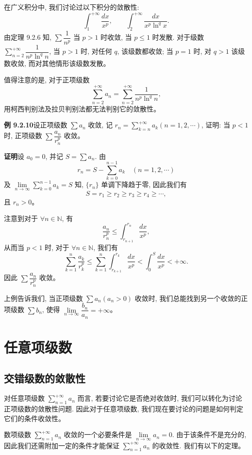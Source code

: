 \documentclass[UTF8, 12pt, fontset=fandol, oneside]{ctexart}
\begin{document}
在广义积分中, 我们讨论过以下积分的敛散性:
\[
  \int_1^{+\infty}\frac{dx}{x^p},\qquad
  \int_2^{+\infty}\frac{dx}{x^p\ln^q x}.
\]
由定理 9.2.6 知, $\sum\dfrac1{n^p}$ 当 $p>1$ 时收敛, 当 $p\leq1$ 时发散. 对于级数 $\sum\limits_{n=2}^{+\infty}\dfrac1{n^p\ln^q n}$, 当 $p>1$ 时, 对任何 $q$, 该级数都收敛; 当 $p=1$ 时, 对 $q>1$ 该级数收敛, 而对其他情形该级数发散。

值得注意的是, 对于正项级数
\[
  \sum_{n=2}^{+\infty}a_n=\sum_{n=2}^{+\infty}\frac1{n^p\ln^q n},
\]
用柯西判别法及拉贝判别法都无法判别它的敛散性。

\noindent\textbf{例 9.2.10}\quad 设正项级数 $\sum a_n$ 收敛, 记 $r_n=\sum\limits_{k=n}^{+\infty}a_k(n=1,2,\cdots)$, 证明: 当 $p<1$ 时, 正项级数 $\sum\dfrac{a_n}{r_n^p}$ 收敛。

\noindent\textbf{证明}\quad 设 $a_0=0$, 并记 $S=\sum a_n$. 由
\[
  r_n=S-\sum_{k=0}^{n-1}a_k\quad(n=1,2,\cdots)
\]
及 $\lim\limits_{n\to\infty}\sum\limits_{k=0}^{n-1}a_k=S$ 知, $\{r_n\}$ 单调下降趋于零, 因此我们有
\[
  S=r_1\geq r_2\geq r_3\geq r_4\geq\cdots,
\]
且 $r_n>0$。

注意到对于 $\forall n\in\mathbb{N}$, 有
\[
  \frac{a_n}{r_n^p}\leq\int_{r_{n+1}}^{r_n}\frac{dx}{x^p},
\]
从而当 $p<1$ 时, 对于 $\forall n\in\mathbb{N}$, 我们有
\[
  \sum_{k=1}^n\frac{a_k}{r_k^p}
  \leq\sum_{k=1}^n\int_{r_{k+1}}^{r_k}\frac{dx}{x^p}
  <\int_0^S\frac{dx}{x^p}<+\infty.
\]
因此 $\sum\dfrac{a_n}{r_n^p}$ 收敛。

上例告诉我们, 当正项级数 $\sum a_n(a_n>0)$ 收敛时, 我们总能找到另一个收敛的正项级数 $\sum b_n$, 使得 $\lim\limits_{n\to\infty}\dfrac{b_n}{a_n}=+\infty$。

\section{任意项级数}

\subsection{交错级数的敛散性}

对任意项级数 $\sum\limits_{n=1}^{+\infty}a_n$ 而言, 若要讨论它是否绝对收敛时, 我们可以转化为讨论正项级数的敛散性问题. 因此对于任意项级数, 我们现在要讨论的问题是如何判定它们的条件收敛性。

数项级数 $\sum\limits_{n=1}^{+\infty}a_n$ 收敛的一个必要条件是 $\lim\limits_{n\to\infty}a_n=0$. 由于该条件不是充分的, 因此我们还需附加一定的条件才能保证 $\sum\limits_{n=1}^{+\infty}a_n$ 的收敛性. 我们有以下的定理。
\end{document}

